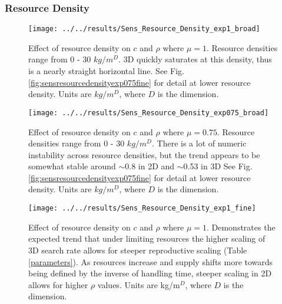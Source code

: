 \begin{refsection}
\subsubsection{Resource Density}

\begin{figure}[H]
	\centering
	\texttt{[image: ../../results/Sens\_Resource\_Density\_exp1\_broad]}
	\caption{Effect of resource density on $c$ and $\rho$ where $\mu = 1$.  Resource densities range from 0 - 30 $kg/m^D$.  3D quickly saturates at this density, thus is a nearly straight horizontal line.  See Fig. \ref{fig:sensresourcedensityexp075fine} for detail at lower resource density.  Units are $kg/m^D$, where $D$ is the dimension.}
	\label{fig:sensresourcedensityexp1broad}
\end{figure}
\begin{figure}[h]
	\centering
	\texttt{[image: ../../results/Sens\_Resource\_Density\_exp075\_broad]}
	\caption{Effect of resource density on $c$ and $\rho$ where $\mu = 0.75$.  Resource densities range from 0 - 30 $kg/m^D$.  There is a lot of numeric instability across resource densities, but the trend appears to be somewhat stable around $\sim$0.8 in 2D and $\sim$0.53 in 3D See Fig. \ref{fig:sensresourcedensityexp075fine} for detail at lower resource density.  Units are $kg/m^D$, where $D$ is the dimension.}
	\label{fig:sensresourcedensityexp075broad}
\end{figure}
	\begin{figure}[h!]
	\centering
	\texttt{[image: ../../results/Sens\_Resource\_Density\_exp1\_fine]}
	\caption{Effect of resource density on $c$ and $\rho$ where $\mu = 1$.  Demonstrates the expected trend that under limiting resources the higher scaling of 3D search rate  allows for steeper reproductive scaling (Table \ref{parameters}).  As resources increase and supply shifts more towards being defined by the inverse of handling time, steeper scaling in 2D allows for higher $\rho$ values.  Units are kg/m$^D$, where $D$ is the dimension.}
	\label{fig:sensresourcedensityexp1fine}
\end{figure}






\end{refsection}
